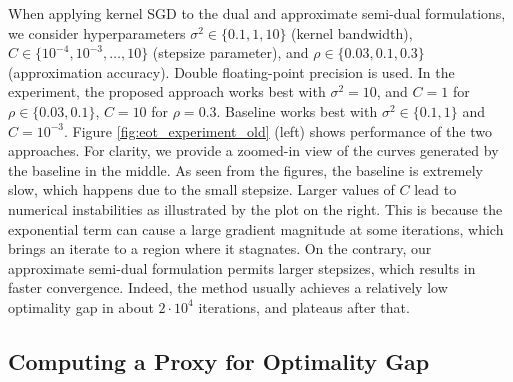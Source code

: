 \documentclass{article}
\theoremstyle{plain}
\theoremstyle{definition}
\theoremstyle{remark}
\begin{document}
When applying kernel SGD to the dual and approximate semi-dual formulations, we consider hyperparameters \( \sigma^2 \in \{0.1, 1, 10\} \) (kernel bandwidth), \( C \in \{10^{-4}, 10^{-3}, \ldots, 10\} \) (stepsize parameter), and \( \rho \in \{0.03, 0.1, 0.3\}\) (approximation accuracy).
Double floating-point precision is used.
In the experiment, the proposed approach works best with \( \sigma^2=10 \), and \( C=1 \) for \( \rho \in \{0.03, 0.1 \} \), \( C=10 \) for \( \rho = 0.3 \).
Baseline works best with \( \sigma^2 \in \{0.1, 1 \} \) and \( C=10^{-3} \).
Figure \ref{fig:eot_experiment_old} (left) shows performance of the two approaches. For clarity, we provide a zoomed-in view of the curves generated by the baseline in the middle.
As seen from the figures, the baseline is extremely slow, which happens due to the small stepsize.
Larger values of \( C \) lead to numerical instabilities as illustrated by the plot on the right.
This is because the exponential term can cause a large gradient magnitude at some iterations, which brings an iterate to a region where it stagnates.
On the contrary, our approximate semi-dual formulation permits larger stepsizes, which results in faster convergence. Indeed, the method usually achieves a relatively low optimality gap in about $2\cdot 10^4$ iterations, and plateaus after that.




\subsection{Computing a Proxy for Optimality Gap}\label{app:opt_gap}
\end{document}

